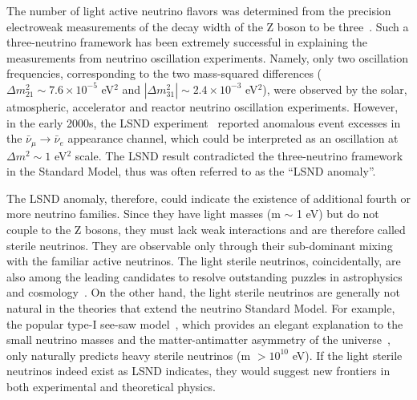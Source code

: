 \documentclass[aps,twocolumn,preprintnumbers,amsmath,superscriptaddress,amssymb,floats,nofootinbib]{revtex4-1}
\begin{document}
The number of light active neutrino flavors was determined from the precision electroweak measurements of the decay width of the Z boson to be three~\cite{EW-2005}. 
Such a three-neutrino framework has been extremely successful in explaining the measurements from neutrino oscillation experiments. 
Namely, only two oscillation frequencies, corresponding to the two mass-squared differences ($\Delta m_{21}^2\sim7.6\times10^{-5}$ eV$^2$ and $|\Delta m_{31}^2|\sim2.4\times10^{-3}$ eV$^2$), were observed by the solar, atmospheric, accelerator and reactor neutrino oscillation experiments. 
However, in the early 2000s, the LSND experiment~\cite{LSND2001} reported anomalous event excesses in the $\bar\nu_\mu\rightarrow\bar\nu_e$ appearance channel, which could be interpreted as an oscillation at $\Delta m^2\sim1$ eV$^2$ scale. 
The LSND result contradicted the three-neutrino framework in the Standard Model, thus was often referred to as the ``LSND anomaly''.

The LSND anomaly, therefore, could indicate the existence of additional
fourth or more neutrino families. 
Since they have light masses (m $\sim$ 1 eV) but do not couple to the Z bosons, they must lack weak interactions and are therefore called sterile neutrinos. 
They are observable only through their sub-dominant mixing with the familiar active neutrinos. 
The light sterile neutrinos, coincidentally, are also among the leading candidates to resolve outstanding puzzles in astrophysics and cosmology~\cite{Dodelson,Kusenko,Wyman,Battye}.
On the other hand, the light sterile neutrinos are generally not natural in the theories that extend the neutrino Standard Model. 
For example, the popular type-I see-saw model~\cite{Minkowski,Yanagida,GellMann,Mohapatra}, which provides an elegant explanation to the small neutrino masses and the matter-antimatter asymmetry of the universe~\cite{Fukugita}, only naturally predicts heavy sterile neutrinos (m $>10^{10}$ eV).
If the light sterile neutrinos indeed exist as LSND indicates, they would suggest new frontiers in both experimental and theoretical physics.
\end{document}
